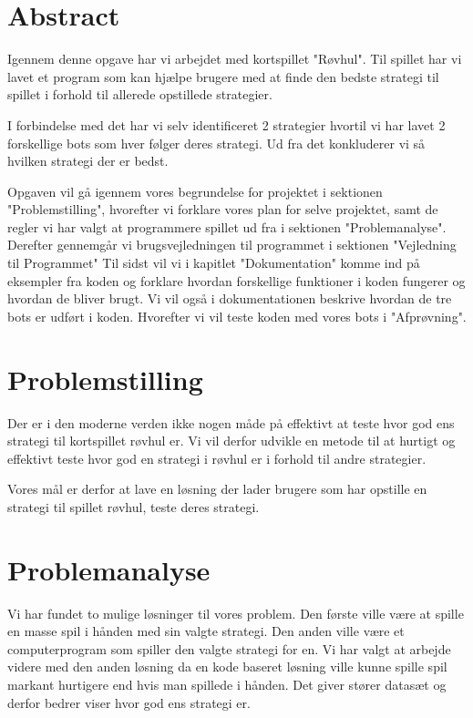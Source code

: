 \documentclass[a4paper, 12pt]{article}
\begin{document}
\begin{multicols}{2}

\section{Abstract}

Igennem denne opgave har vi arbejdet med kortspillet "Røvhul". Til spillet har vi lavet et program som kan hjælpe brugere med at finde den bedste strategi til spillet i forhold til allerede opstillede strategier. 

I forbindelse med det har vi selv identificeret 2 strategier hvortil vi har lavet 2 forskellige bots som hver følger deres strategi. Ud fra det konkluderer vi så hvilken strategi der er bedst.

Opgaven vil gå igennem vores begrundelse for projektet i sektionen "Problemstilling", hvorefter vi forklare vores plan for selve projektet, samt de regler vi har valgt at programmere spillet ud fra i sektionen "Problemanalyse". 
\bigbreak
Derefter gennemgår vi brugsvejledningen til programmet i sektionen "Vejledning til Programmet"
\bigbreak
Til sidst vil vi i kapitlet "Dokumentation" komme ind på eksempler fra koden og forklare hvordan forskellige funktioner i koden fungerer og hvordan de bliver brugt. Vi vil også i dokumentationen beskrive hvordan de tre bots er udført i koden. Hvorefter vi vil teste koden med vores bots i "Afprøvning". 

\section{Problemstilling}

Der er i den moderne verden ikke nogen måde på effektivt at teste hvor god ens strategi til kortspillet røvhul er. Vi vil derfor udvikle en metode til at hurtigt og effektivt teste hvor god en strategi i røvhul er i forhold til andre strategier.

Vores mål er derfor at lave en løsning der lader brugere som har opstille en strategi til spillet røvhul, teste deres strategi.

\section{Problemanalyse}

Vi har fundet to mulige løsninger til vores problem. Den første ville være at spille en masse spil i hånden med sin valgte strategi. Den anden ville være et computerprogram som spiller den valgte strategi for en. Vi har valgt at arbejde videre med den anden løsning da en kode baseret løsning ville kunne spille spil markant hurtigere end hvis man spillede i hånden. Det giver stører datasæt og derfor bedrer viser hvor god ens strategi er.


\end{multicols}
\end{document}
